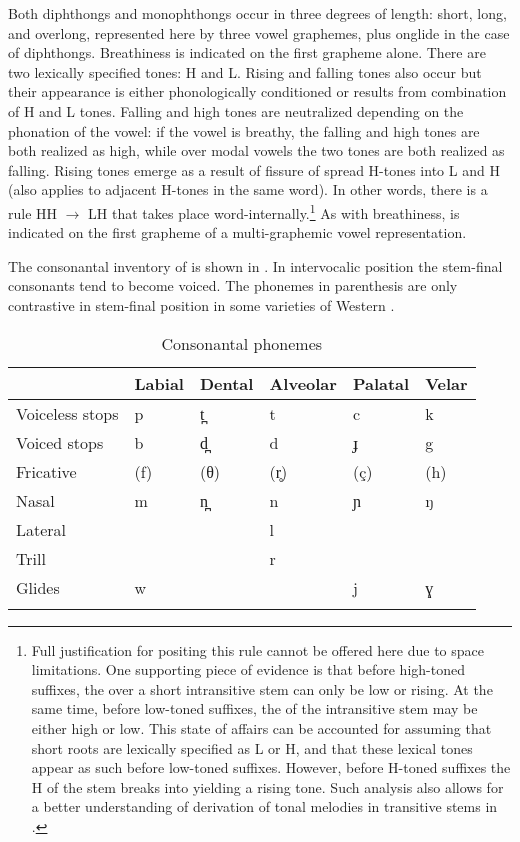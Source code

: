 \documentclass[output=paper,newtxmath,modfonts,nonflat,draftmode]{langsci/langscibook}
\begin{document}
Both diphthongs and monophthongs occur in three degrees of length: short, long, and overlong, represented here by three vowel graphemes, plus onglide in the case of diphthongs. Breathiness is indicated on the first grapheme alone. There are two lexically specified tones: H and L. Rising and falling tones also occur but their appearance is either phonologically conditioned or results from combination of H and L tones. Falling and high tones are neutralized depending on the phonation of the vowel: if the vowel is breathy, the falling and high tones are both realized as high, while over modal vowels the two tones are both realized as falling. Rising tones emerge as a result of fissure of spread H-tones into L and H (also applies to adjacent H-tones in the same word). In other words, there is a rule HH $\rightarrow$ LH that takes place word-internally.\footnote{Full\label{fn:monich:2} justification for positing this rule cannot be offered here due to space limitations. One supporting piece of evidence is that before high-toned suffixes, the  over a short intransitive stem can only be low or rising. At the same time, before low-toned suffixes, the  of the intransitive stem may be either high or low. This state of affairs can be accounted for assuming that short roots are lexically specified as L or H, and that these lexical tones appear as such before low-toned suffixes. However, before H-toned suffixes the H of the stem breaks into yielding a rising tone. Such analysis also allows for a better understanding of derivation of tonal melodies in transitive stems in .} As with breathiness,  is indicated on the first grapheme of a multi-graphemic vowel representation.

\largerpage
The consonantal inventory of  is shown in . In intervocalic position the stem-final consonants tend to become voiced. The phonemes in parenthesis are only contrastive in stem-final position in some varieties of Western .


 


\begin{table}[t]
\begin{tabularx}{\textwidth}{lXXXXX}
\lsptoprule
& \bfseries Labial & \bfseries Dental & \bfseries Alveolar & \bfseries Palatal & \bfseries Velar\\
\midrule 
Voiceless stops & p & t̪ & t & c & k\\
Voiced stops & b & d̪ & d & ɟ & g\\
Fricative & (f) & (θ) & (r̥) & (ç) & (h)\\
Nasal & m & n̪ & n & ɲ & ŋ\\
Lateral &  &  & l &  & \\
Trill &  &  & r &  & \\
Glides & w &  &  & j & ɣ\\
\lspbottomrule
\end{tabularx}
\caption{Consonantal phonemes}
\label{tab:monich:2}
\end{table}
\end{document}
